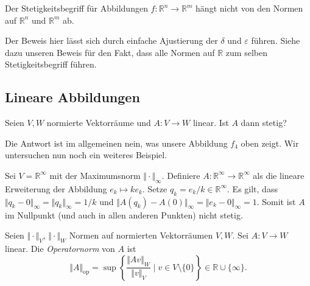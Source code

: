 \documentclass[../main.tex]{subfiles}
\begin{document}
\begin{corollary}\label{cor:continuity-independent}
  Der Stetigkeitsbegriff für Abbildungen
  $f \colon \mathbb{R}^n \to \mathbb{R}^m$
  hängt nicht von den Normen auf $\mathbb{R}^n$
  und $\mathbb{R}^m$ ab.
\end{corollary}

Der Beweis hier lässt sich durch einfache Ajustierung
der $\delta$ und $\varepsilon$ führen.
Siehe dazu unseren Beweis für den Fakt,
dass alle Normen auf $\mathbb{R}$ zum
selben Stetigkeitsbegriff führen.

\subsection*{Lineare Abbildungen}
\begin{question}
Seien $V, W$ normierte Vektorräume und
$A \colon V \to W$ linear.
Ist $A$ dann stetig?
\end{question}

Die Antwort ist im allgemeinen nein, was unsere
Abbildung $f_4$ oben zeigt. Wir untersuchen
nun noch ein weiteres Beispiel.

\begin{example}
  Sei $V = \mathbb{R}^{\infty}$ mit der
  Maximumsnorm $\Vert \cdot \Vert_{\infty}$.
  Definiere $A \colon \mathbb{R}^{\infty} \to \mathbb{R}^{\infty}$
  als die lineare Erweiterung der Abbildung $e_k \mapsto ke_k$.
  Setze  $q_k = e_k/k \in \mathbb{R}^{\infty}$.
  Es gilt, dass
  \(
    \Vert q_k - 0 \Vert_{\infty} = \Vert q_k \Vert_{\infty} = 1/k
  \)
  und $\Vert A(q_k) - A(0) \Vert_{\infty} = \Vert e_k - 0 \Vert_{\infty}
  = 1$. Somit ist $A$ im Nullpunkt (und auch in allen anderen Punkten)
  nicht stetig.
\end{example}

\begin{definition}
  Seien $\Vert \cdot \Vert_V$, $\Vert \cdot \Vert_W$
  Normen auf normierten Vektorräumen $V, W$.
  Sei $A \colon V \to W$ linear.
  Die \emph{Operatornorm} von $A$ ist
  \[
    \Vert A \Vert_{\text{op}} = \sup
    \left\{\frac{\Vert Av \Vert_W}{\Vert v \Vert_V} \mid v \in
    V \setminus \{0\}\right\} \in \mathbb{R} \cup \{\infty\}.
  \]
\end{definition}
\end{document}
